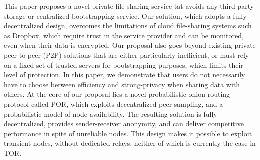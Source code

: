 %
This paper proposes a novel private file sharing service tat avoids any third-party storage or centralized bootstrapping service.
Our solution, which adopts a fully decentralized design, overcomes the limitations of cloud file-sharing systems such as Dropbox, which require trust in the service provider and can be monitored, even when their data is encrypted. Our proposal also goes beyond existing private peer-to-peer (P2P) solutions that are either particularly inefficient, or must rely on a fixed set of trusted servers for bootstrapping purposes, which limits their level of protection. %
In this paper, we demonstrate that users do not necessarily have to choose between efficiency and strong-privacy when sharing data with others. %
 At the core of our proposal lies a novel probabilistic onion routing protocol called POR, which exploits decentralized peer sampling, and a probabilistic model of node availability. 
The resulting solution is fully decentralized, provides sender-receiver anonymity, and can deliver competitive performance in spite of unreliable nodes. %
This design makes it possible to exploit transient nodes, without dedicated relays, %
neither of which is currently the case in TOR.

